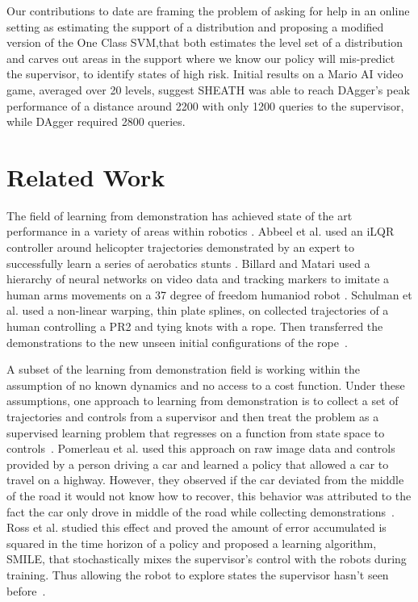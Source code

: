 \documentclass[10pt, conference]{ieeeconf}      %
\begin{document}
Our contributions to date are framing the problem of asking for help in an online setting as estimating the support of a distribution and proposing a modified version of the One Class SVM,that both estimates the level set of a distribution and carves out areas in the support where we know our policy will mis-predict the supervisor, to identify states of high risk.  Initial results on a Mario AI video game, averaged over 20 levels,  suggest SHEATH was able to reach DAgger's peak performance of a distance around 2200 with only 1200 queries to the supervisor, while DAgger required 2800 queries.  

\section{Related Work}
The field of learning from demonstration has achieved state of the art performance in a variety of areas within robotics \cite{argall2009survey}. Abbeel et al. used an iLQR controller around helicopter trajectories demonstrated by an expert to successfully learn a series of aerobatics stunts \cite{abbeel2007application}. Billard and Matari used a hierarchy of neural networks on video data and tracking markers to imitate a human arms movements on a 37 degree of freedom humaniod robot \cite{billard2001learning}. Schulman et al. used a non-linear warping, thin plate splines, on collected trajectories of a human controlling a PR2 and tying knots with a rope. Then transferred the demonstrations to the new unseen initial configurations of the rope~\cite{schulman2013case}. 

 A subset of the learning from demonstration field is working within the assumption of no known dynamics and no access to a cost function. Under these assumptions, one approach to learning from demonstration is to collect a set of trajectories and controls from a supervisor and then treat the problem as a supervised learning problem that regresses on a function from state space to controls~\cite{argall2009survey}. Pomerleau et al. used this approach on raw image data and controls provided by a person driving a car and learned a policy that allowed a car to travel on a highway. However, they observed if the car deviated from the middle of the road it would not know how to recover, this behavior was attributed to the fact the car only drove in middle of the road while collecting demonstrations~\cite{pomerleau1989alvinn}. Ross et al. studied this effect and proved the amount of error accumulated is squared in the time horizon of a policy and proposed a learning algorithm, SMILE, that stochastically mixes the supervisor's control with the robots during training. Thus allowing the robot to explore states the supervisor hasn't seen before~\cite{ross2010efficient}. 
\end{document}

